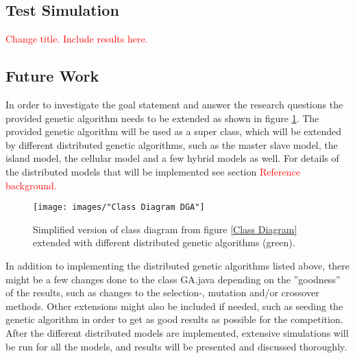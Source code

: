 \subsection{Test Simulation}


\textcolor{red}{Change title. Include results here.}


\subsection{Future Work}


In order to investigate the goal statement and answer the research questions the provided genetic algorithm needs to be extended as shown in figure \ref{Class Diagram DGA}. The provided genetic algorithm will be used as a super class, which will be extended by different distributed genetic algorithms, such as the master slave model, the island model, the cellular model and a few hybrid models as well. For details of the distributed models that will be implemented see section \textcolor{red}{Reference background.}\\


\begin{figure}[h!]
\begin{center}
\texttt{[image: images/"Class Diagram DGA"]}
\caption{Simplified version of class diagram from figure \ref{Class Diagram} extended with different distributed genetic algorithms (green).}
\label{Class Diagram DGA}
\end{center}
\end{figure}


\noindent In addition to implementing the distributed genetic algorithms listed above, there might be a few changes done to the class GA.java depending on the ''goodness'' of the results, such as changes to the selection-, mutation and/or crossover methods. Other extensions might also be included if needed, such as seeding the genetic algorithm in order to get as good results as possible for the competition.\\

\noindent After the different distributed models are implemented, extensive simulations will be run for all the models, and results will be presented and discussed thoroughly. 

